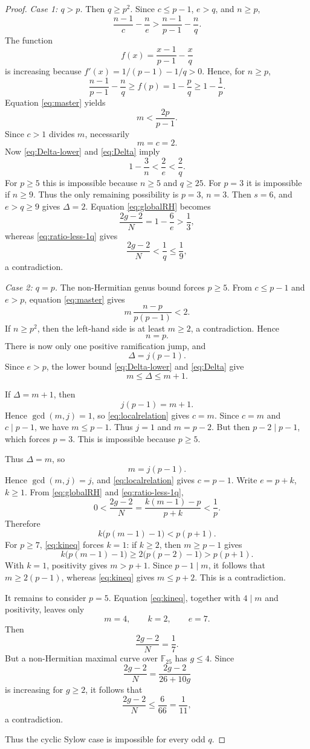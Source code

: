 \documentclass[11pt]{amsart}
\theoremstyle{remark}
\newcommand{\F}{\mathbb F}
\begin{document}
\begin{proof}
\medskip
\noindent\emph{Case 1: $q>p$.}
Then $q\ge p^2$.  Since $c\le p-1$, $e>q$, and $n\ge p$,
\[
 \frac{n-1}{c}-\frac{n}{e}
 >
 \frac{n-1}{p-1}-\frac{n}{q}.
\]
The function
\[
          f(x)=\frac{x-1}{p-1}-\frac{x}{q}
\]
is increasing because
$f'(x)=1/(p-1)-1/q>0$.  Hence, for $n\ge p$,
\[
 \frac{n-1}{p-1}-\frac{n}{q}
 \ge f(p)=1-\frac pq\ge1-\frac1p.
\]
Equation \eqref{eq:master} yields
\[
          m<\frac{2p}{p-1}.
\]
Since $c>1$ divides $m$, necessarily
\[
          m=c=2.
\]
Now \eqref{eq:Delta-lower} and \eqref{eq:Delta} imply
\[
          1-\frac3n<\frac2e<\frac2q.
\]
For $p\ge5$ this is impossible because $n\ge5$ and $q\ge25$.
For $p=3$ it is impossible if $n\ge9$.  Thus the only remaining
possibility is $p=3$, $n=3$.  Then $s=6$, and $e>q\ge9$ gives
$\Delta=2$.  Equation \eqref{eq:globalRH} becomes
\[
          \frac{2g-2}{N}=1-\frac6e>\frac13,
\]
whereas \eqref{eq:ratio-less-1q} gives
\[
          \frac{2g-2}{N}<\frac1q\le\frac19,
\]
a contradiction.

\medskip
\noindent\emph{Case 2: $q=p$.}
The non-Hermitian genus bound forces $p\ge5$.  From
$c\le p-1$ and $e>p$, equation \eqref{eq:master} gives
\[
          m\,\frac{n-p}{p(p-1)}<2.
\]
If $n\ge p^2$, then the left-hand side is at least $m\ge2$, a
contradiction.  Hence
\[
          n=p.
\]
There is now only one positive ramification jump, and
\[
          \Delta=j(p-1).
\]
Since $e>p$, the lower bound \eqref{eq:Delta-lower} and
\eqref{eq:Delta} give
\[
          m\le\Delta\le m+1.
\]

If $\Delta=m+1$, then
\[
          j(p-1)=m+1.
\]
Hence $\gcd(m,j)=1$, so \eqref{eq:localrelation} gives $c=m$.
Since $c=m$ and $c\mid p-1$, we have $m\le p-1$.  Thus
$j=1$ and $m=p-2$.  But then $p-2\mid p-1$, which forces $p=3$.
This is impossible because $p\ge5$.

Thus $\Delta=m$, so
\[
          m=j(p-1).
\]
Hence $\gcd(m,j)=j$, and \eqref{eq:localrelation} gives $c=p-1$.
Write $e=p+k$, $k\ge1$.  From \eqref{eq:globalRH} and \eqref{eq:ratio-less-1q},
\[
          0<
          \frac{2g-2}{N}
          =
          \frac{k(m-1)-p}{p+k}
          <\frac1p.
\]
Therefore
\begin{equation}\label{eq:kineq}
          k\bigl(p(m-1)-1\bigr)<p(p+1).
\end{equation}
For $p\ge7$, \eqref{eq:kineq} forces $k=1$: if $k\ge2$, then
$m\ge p-1$ gives
\[
  k\bigl(p(m-1)-1\bigr)
  \ge2\bigl(p(p-2)-1\bigr)>p(p+1).
\]
With $k=1$, positivity gives $m>p+1$.  Since $p-1\mid m$, it follows
that $m\ge2(p-1)$, whereas \eqref{eq:kineq} gives $m\le p+2$.
This is a contradiction.

It remains to consider $p=5$.  Equation \eqref{eq:kineq}, together
with $4\mid m$ and positivity, leaves only
\[
          m=4,\qquad k=2,\qquad e=7.
\]
Then
\[
          \frac{2g-2}{N}=\frac17.
\]
But a non-Hermitian maximal curve over $\F_{25}$ has $g\le4$.  Since
\[
          \frac{2g-2}{N}
          =\frac{2g-2}{26+10g}
\]
is increasing for $g\ge2$, it follows that
\[
          \frac{2g-2}{N}
          \le\frac{6}{66}
          =\frac1{11},
\]
a contradiction.

Thus the cyclic Sylow case is impossible for every odd $q$.
\end{proof}
\end{document}
